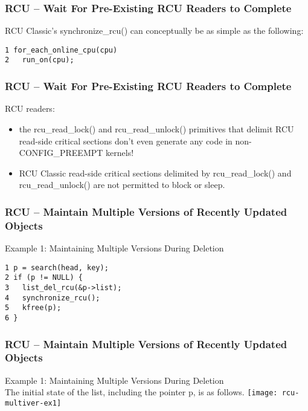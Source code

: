 \begin{frame}[fragile]
    \frametitle{RCU -- Wait For Pre-Existing RCU Readers to Complete}
    \large
    RCU Classic's synchronize\_rcu() can conceptually be as simple as the following:
    \begin{block}{}
        \begin{verbatim}
1 for_each_online_cpu(cpu)
2   run_on(cpu);
        \end{verbatim}
    \end{block}  
    \large

\end{frame}
\begin{frame}[fragile]
    \frametitle{RCU -- Wait For Pre-Existing RCU Readers to Complete}
    \Large
    RCU  readers: 
    \begin{itemize}
        \item   the rcu\_read\_lock() and rcu\_read\_unlock() primitives that delimit RCU read-side critical sections don't even generate any code in non-CONFIG\_PREEMPT kernels! 
        \item RCU Classic read-side critical sections delimited by rcu\_read\_lock() and rcu\_read\_unlock() are not permitted to block or sleep.
    \end{itemize}
\end{frame}


\begin{frame}[fragile]
    \frametitle{RCU -- Maintain Multiple Versions of Recently Updated Objects}
    \Large
    Example 1: Maintaining Multiple Versions During Deletion
\begin{block}{}
    \begin{verbatim}
1 p = search(head, key);
2 if (p != NULL) {
3   list_del_rcu(&p->list);
4   synchronize_rcu();
5   kfree(p);
6 }
    \end{verbatim}
\end{block} 
\end{frame}


\begin{frame}[fragile]
    \frametitle{RCU -- Maintain Multiple Versions of Recently Updated Objects}
    \Large
    Example 1: Maintaining Multiple Versions During Deletion \\
    
    The initial state of the list, including the pointer p, is as follows. 
\texttt{[image: rcu-multiver-ex1]}
\end{frame}

